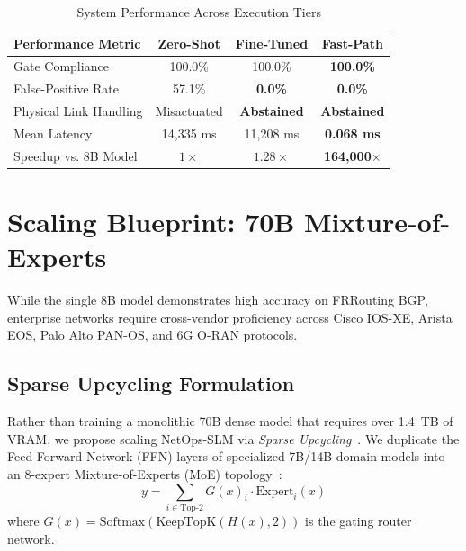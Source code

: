 \documentclass[conference]{IEEEtran}
\begin{document}
\begin{table}[t]
\caption{System Performance Across Execution Tiers}
\label{tab:comparison}
\centering
\footnotesize
\begin{tabular}{@{}lccc@{}}
\toprule
\textbf{Performance Metric} & \textbf{Zero-Shot} & \textbf{Fine-Tuned} & \textbf{Fast-Path} \\
\midrule
Gate Compliance & 100.0\% & 100.0\% & \textbf{100.0\%} \\
False-Positive Rate & 57.1\% & \textbf{0.0\%} & \textbf{0.0\%} \\
Physical Link Handling & Misactuated & \textbf{Abstained} & \textbf{Abstained} \\
Mean Latency & 14,335 ms & 11,208 ms & \textbf{0.068 ms} \\
Speedup vs. 8B Model & $1\times$ & $1.28\times$ & \textbf{164,000$\times$} \\
\bottomrule
\end{tabular}
\end{table}

\newpage
\section{Scaling Blueprint: 70B Mixture-of-Experts}
While the single 8B model demonstrates high accuracy on FRRouting BGP, enterprise networks require cross-vendor proficiency across Cisco IOS-XE, Arista EOS, Palo Alto PAN-OS, and 6G O-RAN protocols.

\subsection{Sparse Upcycling Formulation}
Rather than training a monolithic 70B dense model that requires over 1.4~TB of VRAM, we propose scaling NetOps-SLM via \textit{Sparse Upcycling}~\cite{komatsuzaki2023sparse}. We duplicate the Feed-Forward Network (FFN) layers of specialized 7B/14B domain models into an 8-expert Mixture-of-Experts (MoE) topology~\cite{fedus2022switch}:
\begin{equation}
y = \sum_{i \in \text{Top-2}} G(x)_i \cdot \text{Expert}_i(x)
\end{equation}
where $G(x) = \text{Softmax}(\text{KeepTopK}(H(x), 2))$ is the gating router network.
\end{document}
